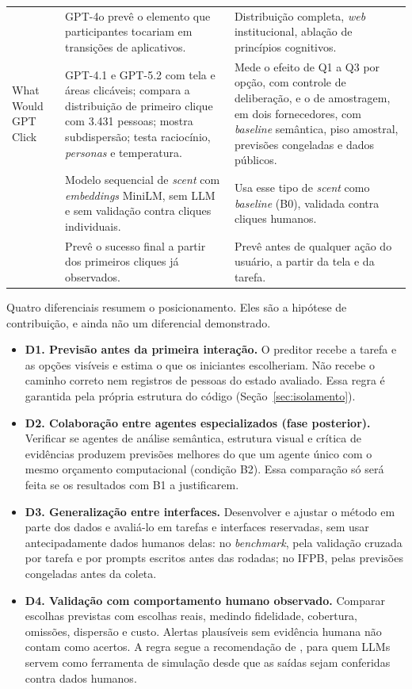 \documentclass[12pt,oneside,a4paper,chapter=TITLE,english,brazil]{abntex2}
\begin{document}
\begin{table}[p]
\begin{tabularx}{\textwidth}{@{}p{3.3cm}YY@{}}
 & GPT-4o prevê o elemento que participantes tocariam em transições de aplicativos. & Distribuição completa, \textit{web} institucional, ablação de princípios cognitivos. \\
What Would GPT Click \cite{kuric2026wwgc} & GPT-4.1 e GPT-5.2 com tela e áreas clicáveis; compara a distribuição de primeiro clique com 3.431 pessoas; mostra subdispersão; testa raciocínio, \textit{personas} e temperatura. & Mede o efeito de Q1 a Q3 por opção, com controle de deliberação, e o de amostragem, em dois fornecedores, com \textit{baseline} semântica, piso amostral, previsões congeladas e dados públicos. \\
 & Modelo sequencial de \textit{scent} com \textit{embeddings} MiniLM, sem LLM e sem validação contra cliques individuais. & Usa esse tipo de \textit{scent} como \textit{baseline} (B0), validada contra cliques humanos. \\
 & Prevê o sucesso final a partir dos primeiros cliques já observados. & Prevê antes de qualquer ação do usuário, a partir da tela e da tarefa. \\
\bottomrule
\end{tabularx}
\end{table}

Quatro diferenciais resumem o posicionamento. Eles são a hipótese de contribuição, e ainda não um diferencial demonstrado.

\begin{itemize}
\item \textbf{D1. Previsão antes da primeira interação.} O preditor recebe a tarefa e as opções visíveis e estima o que os iniciantes escolheriam. Não recebe o caminho correto nem registros de pessoas do estado avaliado. Essa regra é garantida pela própria estrutura do código (Seção~\ref{sec:isolamento}).
\item \textbf{D2. Colaboração entre agentes especializados (fase posterior).} Verificar se agentes de análise semântica, estrutura visual e crítica de evidências produzem previsões melhores do que um agente único com o mesmo orçamento computacional (condição B2). Essa comparação só será feita se os resultados com B1 a justificarem.
\item \textbf{D3. Generalização entre interfaces.} Desenvolver e ajustar o método em parte dos dados e avaliá-lo em tarefas e interfaces reservadas, sem usar antecipadamente dados humanos delas: no \textit{benchmark}, pela validação cruzada por tarefa e por prompts escritos antes das rodadas; no IFPB, pelas previsões congeladas antes da coleta.
\item \textbf{D4. Validação com comportamento humano observado.} Comparar escolhas previstas com escolhas reais, medindo fidelidade, cobertura, omissões, dispersão e custo. Alertas plausíveis sem evidência humana não contam como acertos. A regra segue a recomendação de , para quem LLMs servem como ferramenta de simulação desde que as saídas sejam conferidas contra dados humanos.
\end{itemize}
\end{document}
